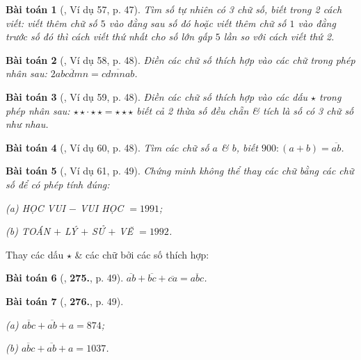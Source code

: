 \documentclass{article}
\numberwithin{equation}{section}
\newtheorem{baitoan}{Bài toán}
\begin{document}
\begin{baitoan}[\cite{Binh_Toan_6_tap_1}, Ví dụ 57, p. 47]
	Tìm số tự nhiên có 3 chữ số, biết trong 2 cách viết: viết thêm chữ số $5$ vào đằng sau số đó hoặc viết thêm chữ số $1$ vào đằng trước số đó thì cách viết thứ nhất cho số lớn gấp $5$ lần so với cách viết thứ 2.
\end{baitoan}

\begin{baitoan}[\cite{Binh_Toan_6_tap_1}, Ví dụ 58, p. 48]
	Điền các chữ số thích hợp vào các chữ trong phép nhân sau: $2\overline{abcdmn} = \overline{cdmnab}$.
\end{baitoan}

\begin{baitoan}[\cite{Binh_Toan_6_tap_1}, Ví dụ 59, p. 48]
	Điền các chữ số thích hợp vào các dấu $\star$ trong phép nhân sau: $\star\star\cdot\star\star = \star\star\star$ biết cả 2 thừa số đều chẵn \& tích là số có 3 chữ số như nhau.
\end{baitoan}

\begin{baitoan}[\cite{Binh_Toan_6_tap_1}, Ví dụ 60, p. 48]
	Tìm các chữ số $a$ \& $b$, biết $900:(a + b) = \overline{ab}$.
\end{baitoan}

\begin{baitoan}[\cite{Binh_Toan_6_tap_1}, Ví dụ 61, p. 49]
	Chứng minh không thể thay các chữ bằng các chữ số để có phép tính đúng:
	\begin{enumerate*}
		\item[(a)] \emph{HỌC VUI $-$ VUI HỌC} $= 1991$;
		\item[(b)] \emph{TOÁN $+$ LÝ $+$ SỬ $+$ VẼ} $= 1992$.
	\end{enumerate*}
\end{baitoan}
Thay các dấu $\star$ \& các chữ bởi các số thích hợp:

\begin{baitoan}[\cite{Binh_Toan_6_tap_1}, \textbf{275.}, p. 49]
	$\overline{ab} + \overline{bc} + \overline{ca} = \overline{abc}$.
\end{baitoan}

\begin{baitoan}[\cite{Binh_Toan_6_tap_1}, \textbf{276.}, p. 49]
	\begin{enumerate*}
		\item[(a)] $\overline{abc} + \overline{ab} + a = 874$;
		\item[(b)] $\overline{abc} + \overline{ab} + a = 1037$.
	\end{enumerate*}
\end{baitoan}
\end{document}

